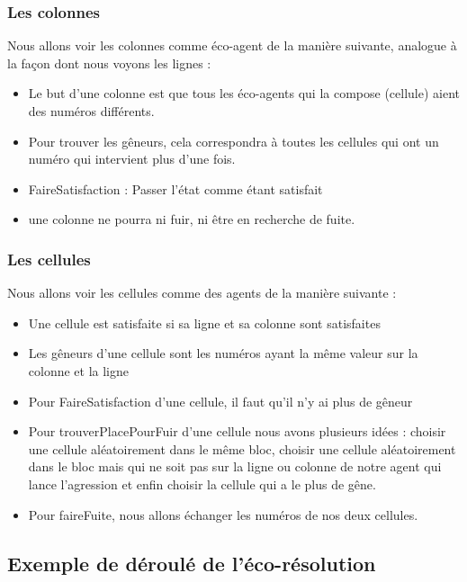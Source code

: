             \subsubsection{Les colonnes}
                Nous allons voir les colonnes comme éco-agent de la manière suivante, analogue à la façon dont nous voyons les lignes : \\
                \begin{itemize}
                    \item Le but d'une colonne est que tous les éco-agents qui la compose (cellule) aient des numéros différents.
                    \item Pour trouver les gêneurs, cela correspondra à toutes les cellules qui ont un numéro qui intervient plus d'une fois. 
                    \item FaireSatisfaction : Passer l'état comme étant satisfait
                    \item une colonne ne pourra ni fuir, ni être en recherche de fuite.   
                \end{itemize}
            \subsubsection{Les cellules}
                Nous allons voir les cellules comme des agents de la manière suivante : 
                \begin{itemize}
                    \item Une cellule est satisfaite si sa ligne et sa colonne sont satisfaites
                    \item Les gêneurs d'une cellule sont les numéros ayant la même valeur sur la colonne et la ligne
                    \item Pour FaireSatisfaction d'une cellule, il faut qu'il n'y ai plus de gêneur
                    \item Pour trouverPlacePourFuir d'une cellule nous avons plusieurs idées : choisir une cellule aléatoirement dans le même bloc, choisir une cellule aléatoirement dans le bloc mais qui ne soit pas sur la ligne ou colonne de notre agent qui lance l'agression et enfin choisir la cellule qui a le plus de gêne.
                    \item Pour faireFuite, nous allons échanger les numéros de nos deux cellules.
                \end{itemize}
                
        \subsection{Exemple de déroulé de l'éco-résolution}
        
